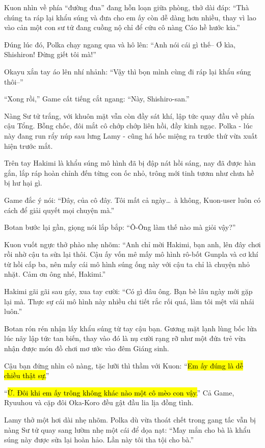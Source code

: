 \documentclass[../main.tex]{subfiles}
\begin{document}
Kuon nhìn về phía ``đường đua'' đang hỗn loạn giữa phòng, thở dài đáp: ``Thà chúng ta ráp lại khẩu súng và đưa cho em ấy còn dễ dàng hơn nhiều, thay vì lao vào cản một con sư tử đang cuồng nộ chỉ để cứu cô nàng Cáo hề hước kia.''

Đúng lúc đó, Polka chạy ngang qua và hô lên: ``Anh nói cái gì thế-- Ơ kìa, Shishiron! Đừng giết tôi mà!''

Okayu xắn tay áo lên nhí nhảnh: ``Vậy thì bọn mình cùng đi ráp lại khẩu súng thôi--''

``Xong rồi,'' Game cất tiếng cắt ngang: ``Này, Shishiro-san.''

Nàng Sư tử trắng, với khuôn mặt vẫn còn đầy sát khí, lập tức quay đầu về phía cậu Tổng. Bỗng chốc, đôi mắt cô chớp chớp liên hồi, đầy kinh ngạc. Polka - lúc này đang run rẩy núp sau lưng Lamy - cũng há hốc miệng ra trước thứ vừa xuất hiện trước mắt.

Trên tay Hakimi là khẩu súng mô hình đã bị đập nát hồi sáng, nay đã được hàn gắn, lắp ráp hoàn chỉnh đến từng con ốc nhỏ, trông mới tinh tươm như chưa hề bị hư hại gì.

Game đắc ý nói: ``Đây, của cô đây. Tôi mất cả ngày\dots\ à không, Kuon-user luôn có cách để giải quyết mọi chuyện mà.''

Botan bước lại gần, giọng nói lắp bắp: ``Ô-Ông làm thế nào mà giỏi vậy?''

Kuon vuốt ngực thở phào nhẹ nhõm: ``Anh chỉ mời Hakimi, bạn anh, lên đây chơi rồi nhờ cậu ta sửa lại thôi. Cậu ấy vốn mê mấy mô hình rô-bốt Gunpla và cơ khí từ hồi cấp ba, nên mấy cái mô hình súng ống này với cậu ta chỉ là chuyện nhỏ nhặt. Cảm ơn ông nhé, Hakimi.''

Hakimi gãi gãi sau gáy, xua tay cười: ``Có gì đâu ông. Bạn bè lâu ngày mới gặp lại mà. Thực sự cái mô hình này nhiều chi tiết rắc rối quá, làm tôi mệt vãi nhái luôn.''

Botan rón rén nhận lấy khẩu súng từ tay cậu bạn. Gương mặt lạnh lùng bốc lửa lúc nãy lập tức tan biến, thay vào đó là nụ cười rạng rỡ như một đứa trẻ vừa nhận được món đồ chơi mơ ước vào đêm Giáng sinh.

Cậu bạn đứng nhìn cô nàng, tặc lưỡi thì thầm với Kuon: ``\hl{Em ấy đúng là dễ chiều thật sự.}''

``\hl{Ừ. Đôi khi em ấy trông không khác nào một cô mèo con vậy.}'' Cả Game, Ryuuhou và cặp đôi Oka-Koro đều gật đầu lia lịa đồng tình.

Lamy thở một hơi dài nhẹ nhõm. Polka dù vừa thoát chết trong gang tấc vẫn bị nàng Sư tử quay sang lườm nhẹ một cái để dọa nạt: ``May mắn cho bà là khẩu súng này được sửa lại hoàn hảo. Lần này tôi tha tội cho bà.''
\end{document}
